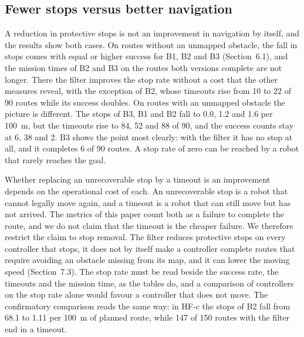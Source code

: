 \subsection{Fewer stops versus better navigation}
A reduction in protective stops is not an improvement in navigation by itself, and the results show both cases. On routes without an unmapped obstacle, the fall in stops comes with equal or higher success for B1, B2 and B3 (Section~6.1), and the mission times of B2 and B3 on the routes both versions complete are not longer. There the filter improves the stop rate without a cost that the other measures reveal, with the exception of B2, whose timeouts rise from 10 to 22 of 90 routes while its success doubles. On routes with an unmapped obstacle the picture is different. The stops of B3, B1 and B2 fall to 0.0, 1.2 and 1.6 per 100~m, but the timeouts rise to 84, 52 and 88 of 90, and the success counts stay at 6, 38 and 2. B3 shows the point most clearly: with the filter it has no stop at all, and it completes 6 of 90 routes. A stop rate of zero can be reached by a robot that rarely reaches the goal.

Whether replacing an unrecoverable stop by a timeout is an improvement depends on the operational cost of each. An unrecoverable stop is a robot that cannot legally move again, and a timeout is a robot that can still move but has not arrived. The metrics of this paper count both as a failure to complete the route, and we do not claim that the timeout is the cheaper failure. We therefore restrict the claim to stop removal. The filter reduces protective stops on every controller that stops, it does not by itself make a controller complete routes that require avoiding an obstacle missing from its map, and it can lower the moving speed (Section~7.3). The stop rate must be read beside the success rate, the timeouts and the mission time, as the tables do, and a comparison of controllers on the stop rate alone would favour a controller that does not move. The confirmatory comparison reads the same way: in HF-c the stops of B2 fall from 68.1 to 1.11 per 100~m of planned route, while 147 of 150 routes with the filter end in a timeout.

